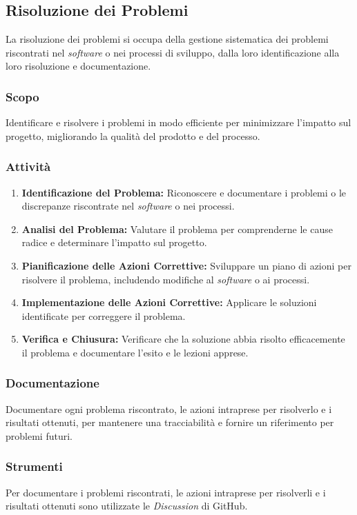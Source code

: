 \subsection{Risoluzione dei Problemi}

La risoluzione dei problemi si occupa della gestione sistematica dei problemi
riscontrati nel \textit{software} o nei processi di sviluppo, dalla loro
identificazione alla loro risoluzione e documentazione.

\subsubsection{Scopo}
Identificare e risolvere i problemi in modo efficiente per minimizzare l'impatto
sul progetto, migliorando la qualità del prodotto e del processo.

\subsubsection{Attività}
\begin{enumerate}
	\item \textbf{Identificazione del Problema:} Riconoscere e documentare i
	      problemi o le discrepanze riscontrate nel \textit{software} o nei
	      processi.
	\item \textbf{Analisi del Problema:} Valutare il problema per comprenderne
	      le cause radice e determinare l'impatto sul progetto.
	\item \textbf{Pianificazione delle Azioni Correttive:} Sviluppare un piano
	      di azioni per risolvere il problema, includendo modifiche al
	      \textit{software} o ai processi.
	\item \textbf{Implementazione delle Azioni Correttive:} Applicare le
	      soluzioni identificate per correggere il problema.
	\item \textbf{Verifica e Chiusura:} Verificare che la soluzione abbia
	      risolto efficacemente il problema e documentare l'esito e le lezioni
	      apprese.
\end{enumerate}

\subsubsection{Documentazione}
Documentare ogni problema riscontrato, le azioni intraprese per risolverlo e i
risultati ottenuti, per mantenere una tracciabilità e fornire un riferimento
per problemi futuri.

\subsubsection{Strumenti}
Per documentare i problemi riscontrati, le azioni intraprese per risolverli e i
risultati ottenuti sono utilizzate le \textit{Discussion} di GitHub.
